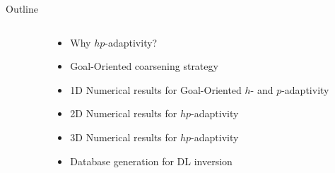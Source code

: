 {

\begin{frame}{Outline}
\begin{columns}
\begin{column}{0.05\textwidth}
\end{column}
\begin{column}{0.95\textwidth}

	\vspace{-0.2cm}
	\begin{itemize}\setlength{\itemindent}{1cm}
	\item Why \( hp \)-adaptivity?
	\item Goal-Oriented coarsening strategy      
	\item 1D Numerical results for Goal-Oriented $h$- and $p$-adaptivity
	\item 2D Numerical results for $hp$-adaptivity
	\item 3D Numerical results for $hp$-adaptivity
	\end{itemize}

\vspace{0.4cm}

	\vspace{-0.2cm}
	\begin{itemize}\setlength{\itemindent}{1cm}
	\item Database generation for DL inversion
	\end{itemize}

\vspace{0.4cm}


\vspace{0.4cm}

\end{column}
\end{columns}

\end{frame} 
}